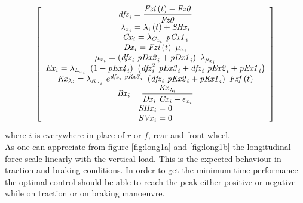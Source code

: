 %
\begin{equation}
\left[ \begin {array}{c} \displaystyle {\it dfz}_{i} =\frac{{\it Fzi} \left(t 
\right)-{\it Fz0} }{{\it Fz0} }\\ \lambda_{x_{i}} =
\lambda_{i} \left(t \right)+{\it SHx}_{i} \\ {\it Cx
}_{i} =\lambda_{C_{x_{i}}} ~{\it pCx1}_{i} \\ {\it 
Dx}_{i} ={\it Fzi} \left(t \right)~\mu_{x_{i}} \\ 
\mu_{x_{i}} =\left({\it dfz}_{i} ~{\it pDx2}_{i} +{\it pDx1}_{i} 
\right)~\lambda_{\mu_{x_{i}}} \\ {\it Ex}_{i} =
\lambda_{E_{x_{i}}} ~\left(1-{\it pEx4}_{i} \right)~\left({\it dfz}_{i
} ^{2}~{\it pEx3}_{i} +{\it dfz}_{i} ~{\it pEx2}_{i} +{\it pEx1}_{i} 
\right)\\ {\it Kx}_{\lambda_{i}} =\lambda_{K_{x_{i}}
} ~e^{{\it dfz}_{i} ~{\it pKx3}_{i} }~\left({\it dfz}_{i} ~{\it pKx2}_
{i} +{\it pKx1}_{i} \right)~{\it Fzf} \left(t \right)
\\ \displaystyle {\it Bx}_{i} =\frac{{\it Kx}_{\lambda_{i}} }{{
\it Dx}_{i} ~{\it Cx}_{i} +\epsilon_{x_{i}} }\\ {
\it SHx}_{i} =0\\ {\it SVx}_{i} =0\end {array}
 \right] 
\end{equation}
%
where $i$ is everywhere in place of $r$ or $f$, rear and front wheel.\\
As one can appreciate from figure \ref{fig:long1a} and \ref{fig:long1b} the longitudinal force scale linearly with the vertical load. This is the expected behaviour in traction and braking conditions. In order to get the minimum time performance the optimal control should be able to reach the peak either positive or negative while on traction or on braking manoeuvre. 
%
